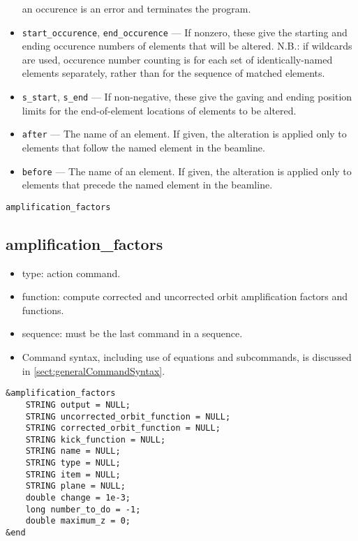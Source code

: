 \documentclass[11pt]{article}
\begin{document}
\begin{itemize}
        an occurence is an error and terminates the program.
\item \verb|start_occurence|, \verb|end_occurence| --- If nonzero, these give the starting and
 ending occurence numbers of elements that will be altered.  N.B.: if wildcards are used, occurence
 number counting is for each set of identically-named elements separately, rather than for the sequence
 of matched elements.
\item \verb|s_start|, \verb|s_end| --- If non-negative, these give the gaving and ending position
 limits for the end-of-element locations of elements to be altered.
\item \verb|after| --- The name of an element.  If given, the alteration is applied only to elements
 that follow the named element in the beamline.  
\item \verb|before| --- The name of an element.  If given, the alteration is applied only to elements
 that precede the named element in the beamline. 
\end{itemize}

\newpage
\begin{center}{\Large\verb|amplification_factors|}\end{center}
\subsection{amplification\_factors \label{subsec:amplificationfactors}}

\begin{itemize}
\item type: action command.
\item function: compute corrected and uncorrected orbit amplification factors and functions.
\item sequence: must be the last command in a sequence.
\item Command syntax, including use of equations and subcommands, is discussed in \ref{sect:generalCommandSyntax}.
\end{itemize}

\begin{verbatim}
&amplification_factors
    STRING output = NULL;
    STRING uncorrected_orbit_function = NULL;
    STRING corrected_orbit_function = NULL;
    STRING kick_function = NULL;
    STRING name = NULL;
    STRING type = NULL;
    STRING item = NULL;
    STRING plane = NULL;
    double change = 1e-3;
    long number_to_do = -1;
    double maximum_z = 0;
&end
\end{verbatim}
\end{document}
